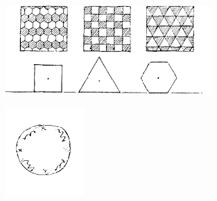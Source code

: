 \begin{center}
	\begin{figure}
	\centering
        \begin{subfigure}[b]{0.5\textwidth}
                \includegraphics[width=\linewidth]{figuras/faradaysketcha.png}
                \caption{}
        \end{subfigure}%
        \begin{subfigure}[b]{0.20\textwidth}
                \includegraphics[width=\linewidth]{figuras/faradaysketchb.png}
                \caption{}
        \end{subfigure}%

\end{figure}
\end{center}
